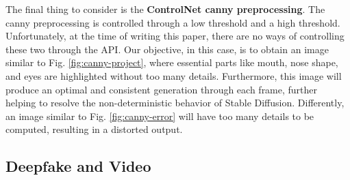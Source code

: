 \documentclass[preprint]{elsarticle}
\begin{document}
The final thing to consider is the \textbf{ControlNet canny preprocessing}. 
The canny preprocessing is controlled through a low threshold and a high threshold. 
Unfortunately, at the time of writing this paper, there are no ways of 
controlling these two through the API.
Our objective, in this case, is to obtain an image similar to Fig. \ref{fig:canny-project}, 
where essential parts like mouth, nose shape, and eyes are highlighted without too many details. 
Furthermore, this image will produce an optimal and consistent generation through each frame, 
further helping to resolve the non-deterministic behavior of Stable Diffusion.
Differently,  an image similar to Fig. \ref{fig:canny-error} will have too many details to be computed, 
resulting in a distorted output.



\subsection{Deepfake and Video}
\end{document}
